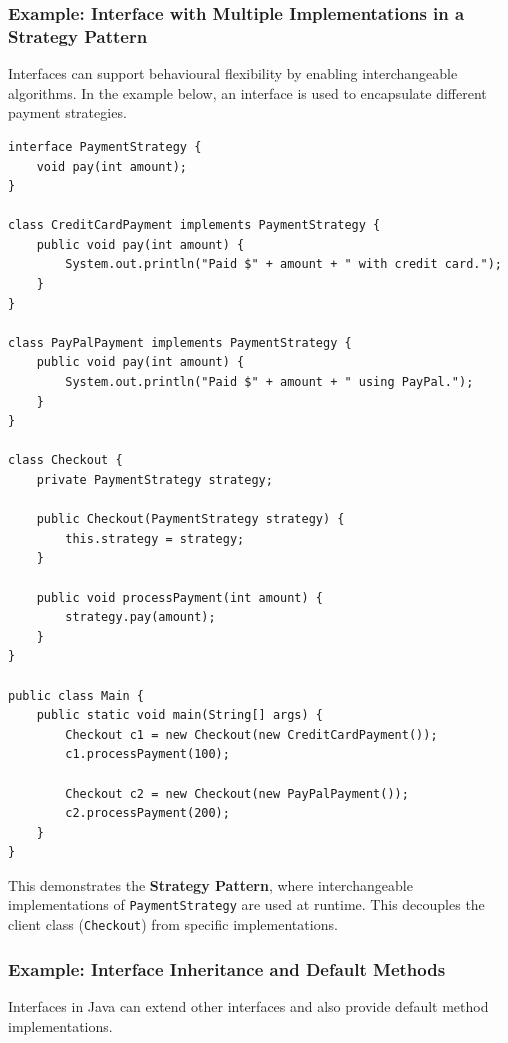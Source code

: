 \documentclass{article}
\newcommand{\codecmd}[1]{\textcolor[rgb]{0,0.5,0}{\texttt{#1}}}
\begin{document}
\subsubsection*{Example: Interface with Multiple Implementations in a Strategy Pattern}

Interfaces can support behavioural flexibility by enabling interchangeable algorithms. In the example below, an interface is used to encapsulate different payment strategies.

\begin{verbatim}
interface PaymentStrategy {
    void pay(int amount);
}

class CreditCardPayment implements PaymentStrategy {
    public void pay(int amount) {
        System.out.println("Paid $" + amount + " with credit card.");
    }
}

class PayPalPayment implements PaymentStrategy {
    public void pay(int amount) {
        System.out.println("Paid $" + amount + " using PayPal.");
    }
}

class Checkout {
    private PaymentStrategy strategy;

    public Checkout(PaymentStrategy strategy) {
        this.strategy = strategy;
    }

    public void processPayment(int amount) {
        strategy.pay(amount);
    }
}

public class Main {
    public static void main(String[] args) {
        Checkout c1 = new Checkout(new CreditCardPayment());
        c1.processPayment(100);

        Checkout c2 = new Checkout(new PayPalPayment());
        c2.processPayment(200);
    }
}
\end{verbatim}

This demonstrates the \textbf{Strategy Pattern}, where interchangeable implementations of \codecmd{PaymentStrategy} are used at runtime. This decouples the client class (\codecmd{Checkout}) from specific implementations.

\subsubsection*{Example: Interface Inheritance and Default Methods}

Interfaces in Java can extend other interfaces and also provide default method implementations.
\end{document}

